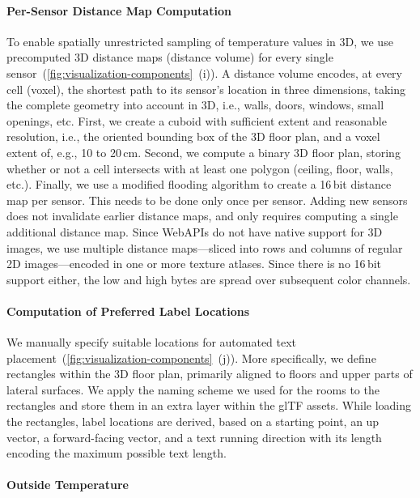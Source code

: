 \documentclass{egpubl}
\begin{document}
\paragraph*{Per-Sensor Distance Map Computation}

To enable spatially unrestricted sampling of temperature values in 3D, we use precomputed 3D distance maps (distance volume) for every single sensor~(\autoref{fig:visualization-components}~(i)).
A distance volume encodes, at every cell (voxel), the shortest path to its sensor’s location in three dimensions, taking the complete geometry into account in 3D, i.e., walls, doors, windows, small openings, etc.
First, we create a cuboid with sufficient extent and reasonable resolution, i.e., the oriented bounding box of the 3D floor plan, and a voxel extent of, e.g., 10 to 20\,cm.
Second, we compute a binary 3D floor plan, storing whether or not a cell intersects with at least one polygon  (ceiling, floor, walls, etc.).
Finally, we use a modified flooding algorithm to create a 16\,bit distance map per sensor.
This needs to be done only once per sensor. 
Adding new sensors does not invalidate earlier distance maps, and only requires computing a single additional distance map.
Since WebAPIs do not have native support for 3D images, we use multiple distance maps---sliced into rows and columns of regular 2D images---encoded in one or more texture atlases.
Since there is no 16\,bit support either, the low and high bytes are spread over subsequent color channels.

\paragraph*{Computation of Preferred Label Locations}

We manually specify suitable locations for automated text placement~(\autoref{fig:visualization-components}~(j)). 
More specifically, we define rectangles within the 3D floor plan, primarily aligned to floors and upper parts of lateral surfaces.
We apply the naming scheme we used for the rooms to the rectangles and store them in an extra layer within the glTF assets.
While loading the rectangles, label locations are derived, based on a starting point, an up vector, a forward-facing vector, and a text running direction with its length encoding the maximum possible text length.

\paragraph*{Outside Temperature}
\end{document}
